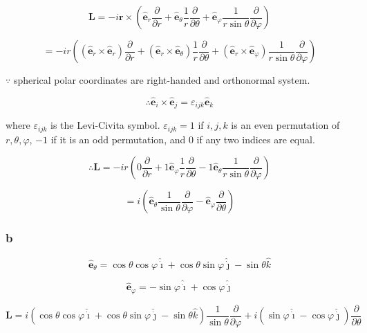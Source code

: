 \documentclass[12pt]{article}
\begin{document}
\[
    \textbf{L} = -i
    \textbf{r} \times
    \left(
    \hat{\mathbf{e}}_r \frac{\partial}{\partial r}
    + \hat{\mathbf{e}}_\theta \frac{1}{r} \frac{\partial}{\partial \theta}
    + \hat{\mathbf{e}}_\varphi \frac{1}{r \sin{\theta}} \frac{\partial}{\partial \varphi}
    \right)
\]

\[
    = -i r
    \left(
    \left(\hat{\mathbf{e}}_r \times \hat{\mathbf{e}}_r\right)  \frac{\partial}{\partial r}
    + \left(\hat{\mathbf{e}}_r \times \hat{\mathbf{e}}_\theta\right)
    \frac{1}{r} \frac{\partial}{\partial \theta}
    + \left(\hat{\mathbf{e}}_r \times \hat{\mathbf{e}}_\varphi\right)
    \frac{1}{r \sin{\theta}} \frac{\partial}{\partial \varphi}
    \right)
\]

\(\because \) spherical polar coordinates are right-handed and orthonormal system.

\[
    \therefore \hat{\mathbf{e}}_i \times \hat{\mathbf{e}}_j = \varepsilon_{ijk} \hat{\mathbf{e}}_k
\]

where \(\varepsilon_{ijk}\) is the Levi-Civita symbol.
\(\varepsilon_{ijk} = 1\) if \(i, j, k\) is an even permutation of \(r, \theta, \varphi \), \(-1\) if it
is an odd permutation, and 0 if any two indices are equal.

\[
    \therefore \textbf{L} = -i r
    \left(
    0  \frac{\partial}{\partial r}
    + 1 \hat{\mathbf{e}}_\varphi
    \frac{1}{r} \frac{\partial}{\partial \theta}
    - 1 \hat{\mathbf{e}}_\theta
    \frac{1}{r \sin{\theta}} \frac{\partial}{\partial \varphi}
    \right)
\]

\[
    = i
    \left(
    \hat{\mathbf{e}}_\theta \frac{1}{\sin{\theta}} \frac{\partial}{\partial \varphi}
    - \hat{\mathbf{e}}_\varphi \frac{\partial}{\partial \theta}
    \right)
\]

\subsubsection{b}

\[
    \hat{\mathbf{e}}_\theta
    = \cos{\theta} \cos{\varphi} \hat{\dot{\imath}}
    + \cos{\theta} \sin{\varphi} \hat{\dot{\jmath}}
    - \sin{\theta} \hat{k}
\]

\[
    \hat{\mathbf{e}}_\varphi
    = -\sin{\varphi} \hat{\dot{\imath}}
    + \cos{\varphi} \hat{\dot{\jmath}}
\]

\[
    \textbf{L} =
    i \left(
    \cos{\theta} \cos{\varphi} \hat{\dot{\imath}}
    + \cos{\theta} \sin{\varphi} \hat{\dot{\jmath}}
    - \sin{\theta} \hat{k}
    \right)
    \frac{1}{\sin{\theta}} \frac{\partial}{\partial \varphi}
    +i \left(
    \sin{\varphi} \hat{\dot{\imath}}
    -\cos{\varphi} \hat{\dot{\jmath}}
    \right)
    \frac{\partial}{\partial \theta}
\]
\end{document}
